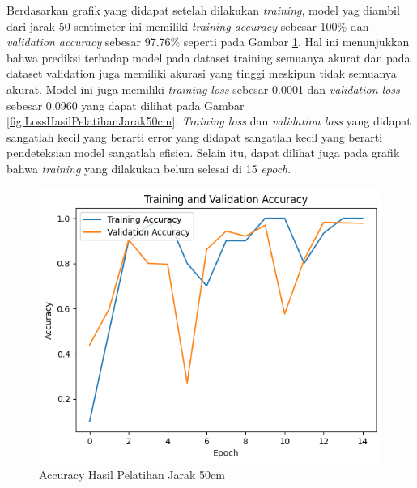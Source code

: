 Berdasarkan grafik yang didapat setelah dilakukan \emph{training}, model yag diambil dari jarak 50 sentimeter ini memiliki \emph{training accuracy} sebesar 100\% dan \emph{validation accuracy} sebesar 97.76\% seperti pada Gambar \ref{fig:AccuracyHasilPelatihanJarak50cm}. Hal ini menunjukkan bahwa prediksi terhadap model pada dataset training semuanya akurat dan pada dataset validation juga memiliki akurasi yang tinggi meskipun tidak semuanya akurat. Model ini juga memiliki \emph{training loss} sebesar 0.0001 dan \emph{validation loss} sebesar 0.0960 yang dapat dilihat pada Gambar \ref{fig:LossHasilPelatihanJarak50cm}. \emph{Training loss} dan \emph{validation loss} yang didapat sangatlah kecil yang berarti error yang didapat sangatlah kecil yang berarti pendeteksian model sangatlah efisien. Selain itu, dapat dilihat juga pada grafik bahwa \emph{training} yang dilakukan belum selesai di 15 \emph{epoch}.  


\begin{figure} [H] \centering
  \includegraphics[scale=0.7]{gambar/50accuracy.png}
  \caption{Accuracy Hasil Pelatihan Jarak 50cm}
  \label{fig:AccuracyHasilPelatihanJarak50cm}
\end{figure}

